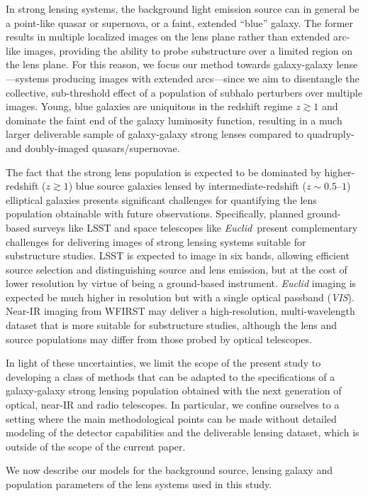 \documentclass[twocolumn]{aastex62}
\newcommand{\Euclid}{\textsl{Euclid}~}
\begin{document}
In strong lensing systems, the background light emission source can in general be a point-like quasar or supernova, or a faint, extended ``blue'' galaxy. The former results in multiple localized images on the lens plane rather than extended arc-like images, providing the ability to probe substructure over a limited region on the lens plane. For this reason, we focus our method towards galaxy-galaxy lense---systems producing images with extended arcs---since we aim to disentangle the collective, sub-threshold effect of a population of subhalo perturbers over multiple images. Young, blue galaxies are uniquitous in the redshift regime $z\gtrsim1$ and dominate the faint end of the galaxy luminosity function, resulting in a much larger deliverable sample of galaxy-galaxy strong lenses compared to quadruply- and doubly-imaged quasars/supernovae.

The fact that the strong lens population is expected to be dominated by higher-redshift ($z\gtrsim1$) blue source galaxies lensed by intermediate-redshift ($z\sim 0.5$--$1$) elliptical galaxies presents significant challenges for quantifying the lens population obtainable with future observations. Specifically, planned ground-based surveys like LSST and space telescopes like \Euclid present complementary challenges for delivering images of strong lensing systems suitable for substructure studies. LSST is expected to image in six bands, allowing efficient source selection and distinguishing source and lens emission, but at the cost of lower resolution by virtue of being a ground-based instrument. \emph{Euclid} imaging is expected be much higher in resolution but with a single optical passband (\emph{VIS}). Near-IR imaging from WFIRST may deliver a high-resolution, multi-wavelength dataset that is more suitable for substructure studies, although the lens and source populations may differ from those probed by optical telescopes. 

In light of these uncertainties, we limit the scope of the present study to developing a class of methods that can be adapted to the specifications of a galaxy-galaxy strong lensing population obtained with the next generation of optical, near-IR and radio telescopes. In particular, we confine ourselves to a setting where the main methodological points can be made without detailed modeling of the detector capabilities and the deliverable lensing dataset, which is outside of the scope of the current paper.

We now describe our models for the background source, lensing galaxy and population parameters of the lens systems used in this study. 
\end{document}
